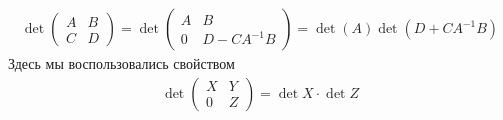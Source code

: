 \begin{sol}
    \begin{gather*}
        \det \left(
        \begin{array}{cc}
           A &  B \\
           C &  D 
        \end{array}\right) =
        \det
         \left(
        \begin{array}{cc}
           A &  B \\
           0 &  D - C A^{-1}B
        \end{array}\right) = \det (A) \det (D +  C A^{-1} B)
    \end{gather*}
    Здесь мы воспользовались свойством
    \begin{gather*}
        \det \left(
        \begin{array}{cc}
           X &  Y \\
           0 &  Z 
        \end{array}\right) = \det X \cdot \det Z
    \end{gather*}
\end{sol}